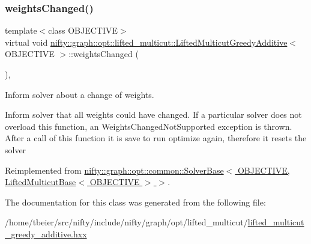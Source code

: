 \subsubsection{\texorpdfstring{weights\+Changed()}{weightsChanged()}}
{\footnotesize\ttfamily template$<$class O\+B\+J\+E\+C\+T\+I\+VE$>$ \\
virtual void \hyperlink{classnifty_1_1graph_1_1opt_1_1lifted__multicut_1_1LiftedMulticutGreedyAdditive}{nifty\+::graph\+::opt\+::lifted\+\_\+multicut\+::\+Lifted\+Multicut\+Greedy\+Additive}$<$ O\+B\+J\+E\+C\+T\+I\+VE $>$\+::weights\+Changed (\begin{DoxyParamCaption}{ }\end{DoxyParamCaption})\hspace{0.3cm}{\ttfamily [inline]}, {\ttfamily [virtual]}}



Inform solver about a change of weights. 

Inform solver that all weights could have changed. If a particular solver does not overload this function, an Weights\+Changed\+Not\+Supported exception is thrown. After a call of this function it is save to run optimize again, therefore it resets the solver 

Reimplemented from \hyperlink{classnifty_1_1graph_1_1opt_1_1common_1_1SolverBase_a6a5d77ee514c4b5f44d1908c1000f0ff}{nifty\+::graph\+::opt\+::common\+::\+Solver\+Base$<$ O\+B\+J\+E\+C\+T\+I\+V\+E, Lifted\+Multicut\+Base$<$ O\+B\+J\+E\+C\+T\+I\+V\+E $>$ $>$}.



The documentation for this class was generated from the following file\+:\begin{DoxyCompactItemize}
\item 
/home/tbeier/src/nifty/include/nifty/graph/opt/lifted\+\_\+multicut/\hyperlink{lifted__multicut__greedy__additive_8hxx}{lifted\+\_\+multicut\+\_\+greedy\+\_\+additive.\+hxx}\end{DoxyCompactItemize}
